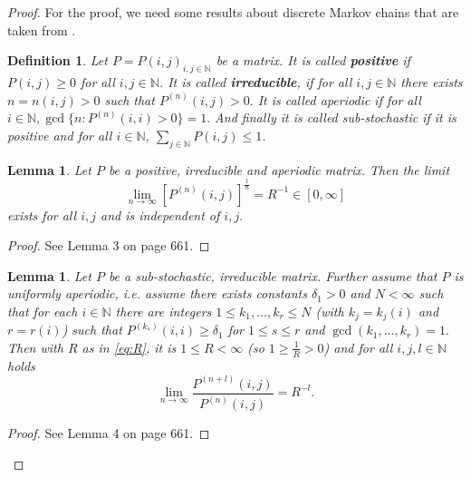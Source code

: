 \documentclass[12pt,a4paper]{scrartcl}
\newtheorem{definition}[theorem]{Definition}
\newtheorem{lemma}[theorem]{Lemma}
\numberwithin{equation}{section}
\newcommand{\N}{\mathbb{N}} %
\begin{document}
\begin{proof}
For the proof, we need some results about discrete Markov chains that are taken from \cite{kesten}.

\begin{definition}
Let $P = P\left(i,j\right)_{i,j \in \N}$ be a matrix. It is called \textbf{positive} if $P\left(i,j\right) \geq 0$ for all $i,j \in \N$. It is called \textbf{irreducible}, if for all $i,j \in \N$ there exists $n = n\left(i,j\right) > 0$ such that $P^{\left(n\right)}\left(i,j\right) > 0.$ It is called aperiodic if for all $i \in \N, \gcd\lbrace n: P^{\left(n\right)}\left(i,i\right) > 0 \rbrace = 1.$ And finally it is called sub-stochastic if it is positive and for all $i \in \N$, $\sum_{j \in \N} P\left(i,j\right) \leq 1$.
\end{definition}


\begin{lemma} \label{kestenlemmaone} Let $P$ be a positive, irreducible and aperiodic matrix. Then the limit
\begin{equation} \label{eq:R}
\lim_{n \to \infty} \left[P^{\left(n\right)}\left(i,j\right) \right]^{\frac{1}{n}} = R^{-1} \in \left[0, \infty\right]
\end{equation}
exists for all $i,j$ and is independent of $i,j.$
\end{lemma}
\begin{proof}
See \cite{kesten} Lemma 3 on page 661.
\end{proof}

\begin{lemma} \label{kestenlemmatwo}
Let $P$ be a sub-stochastic, irreducible matrix. Further assume that $P$ is uniformly aperiodic, i.e. assume there exists constants $\delta_1 > 0$ and $N < \infty$ such that for each $i \in \N$ there are integers $1\leq k_1,\ldots,k_r \leq N$ (with $k_j = k_j\left(i\right)$ and $r=r\left(i\right)$) such that $P^{\left(k_s\right)}\left(i,i\right) \geq \delta_1$ for $1\leq s \leq r$ and $\gcd\left(k_1,\ldots,k_r\right) = 1.$
Then with $R$ as in \eqref{eq:R}, it is $1 \leq R < \infty$ (so $1\geq \frac{1}{R} > 0$) and for all $i,j,l \in \N$ holds
\begin{equation}
\lim_{n \to \infty} \frac{P^{\left(n+l\right)}\left(i,j\right)}{P^{\left(n\right)}\left(i,j\right)} = R^{-l}.
\end{equation}

\end{lemma}
\begin{proof}
See \cite{kesten} Lemma 4 on page 661.
\end{proof}


\end{proof}
\end{document}

